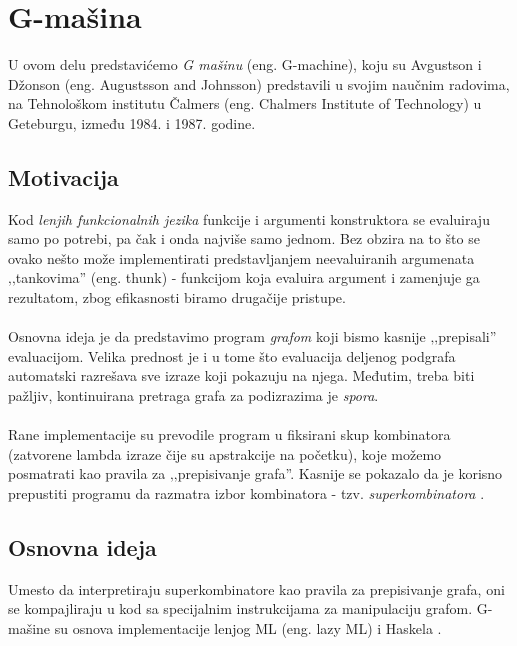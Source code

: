 \section{G-mašina}
\label{sec:Gmasine}

U ovom delu predstavićemo {\em G mašinu} (eng. G-machine), koju su Avgustson i Džonson (eng. Augustsson and Johnsson) predstavili u svojim naučnim radovima, na Tehnološkom institutu Čalmers (eng. Chalmers Institute of Technology) u Geteburgu, između 1984. i 1987. godine. 

\subsection{Motivacija}
Kod {\em lenjih funkcionalnih jezika} funkcije i argumenti konstruktora se evaluiraju samo po potrebi, pa čak i onda najviše samo jednom. Bez obzira na to što se ovako nešto može implementirati predstavljanjem neevaluiranih argumenata ‚‚tankovima'' (eng. thunk) - funkcijom koja evaluira argument i zamenjuje ga rezultatom, zbog efikasnosti biramo drugačije pristupe. \\ 
\\Osnovna ideja je da predstavimo program {\em grafom} koji bismo kasnije ‚‚prepisali''  evaluacijom. Velika prednost je i u tome što evaluacija deljenog podgrafa automatski razrešava sve izraze koji pokazuju na njega. Međutim, treba biti pažljiv, kontinuirana pretraga grafa za podizrazima je {\em spora}. \\
\\
Rane implementacije su prevodile program u fiksirani skup kombinatora (zatvorene lambda izraze čije su apstrakcije na početku), koje možemo posmatrati kao pravila za ‚‚prepisivanje grafa''. Kasnije se pokazalo da je korisno prepustiti programu da razmatra izbor kombinatora - tzv. {\em superkombinatora} \cite{super-combinators}. \\ %


\subsection{Osnovna ideja} 
Umesto da interpretiraju superkombinatore kao pravila za prepisivanje grafa, oni se kompajliraju u kod sa specijalnim instrukcijama za manipulaciju grafom. G-mašine su osnova implementacije lenjog ML (eng. lazy ML) \cite{lazy-ML} i Haskela \cite{hbc}.\\ 

